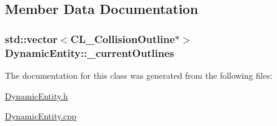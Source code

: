 \subsection{Member Data Documentation}
\hypertarget{class_dynamic_entity_a43f6941301b3829a979830d376228d92}{
\subsubsection[{\_\-currentOutlines}]{\setlength{\rightskip}{0pt plus 5cm}std::vector$<$CL\_\-CollisionOutline$\ast$$>$ {\bf DynamicEntity::\_\-currentOutlines}}}
\label{d6/da4/class_dynamic_entity_a43f6941301b3829a979830d376228d92}


The documentation for this class was generated from the following files:\begin{DoxyCompactItemize}
\item 
\hyperlink{_dynamic_entity_8h}{DynamicEntity.h}\item 
\hyperlink{_dynamic_entity_8cpp}{DynamicEntity.cpp}\end{DoxyCompactItemize}
